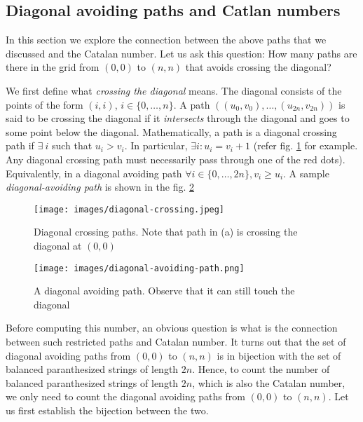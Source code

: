 
\subsection{Diagonal avoiding paths and Catlan numbers}
In this section we explore the connection  between the above paths that we discussed and the Catalan number. 
Let us ask this question:
How many paths are there in the grid from $(0,0)$ to $(n,n)$ that avoids crossing the diagonal? 

We first define what \textit{crossing the diagonal} means. The diagonal consists of the points of the form $(i,i)$, $i\in\{0,\ldots, n\}$. A path $((u_0,v_0), \ldots, (u_{2n},v_{2n}))$ is said to be crossing the diagonal if it \textit{intersects} through the diagonal and goes to some point below the diagonal. Mathematically, a path is a diagonal crossing path if $\exists~i$ such that $u_i>v_i$. In particular, $\exists i: u_i = v_i+1$ (refer fig. \ref{fig:diagonal-crossing-path} for example. Any diagonal crossing path must necessarily pass through one of the red dots). Equivalently, in a diagonal avoiding path $\forall i\in\{0,\ldots, 2n\}, v_i\ge u_i$. A sample \emph{diagonal-avoiding path} is shown in the fig. \ref{fig:diagonal-avoiding-path} %
\begin{figure}[h!]
    \centering
    \texttt{[image: images/diagonal-crossing.jpeg]}
    \caption{Diagonal crossing paths. Note that path in (a) is crossing the diagonal at $(0,0)$}
    \label{fig:diagonal-crossing-path}
\end{figure}

\begin{figure}[h!]
    \centering
    \texttt{[image: images/diagonal-avoiding-path.png]}
    \caption{A diagonal avoiding path. Observe that it can still touch the diagonal}
    \label{fig:diagonal-avoiding-path}
\end{figure}

Before computing this number, an obvious question is what is the connection between such restricted paths and Catalan number. It turns out that the set of diagonal avoiding paths from $(0,0)$ to $(n,n)$ is in bijection with the set of balanced paranthesized strings of length $2n$. Hence, to count the number of balanced paranthesized strings of length $2n$, which is also the Catalan number, we only need to count the diagonal avoiding paths from $(0,0)$ to $(n,n)$. Let us first establish the bijection between the two.

